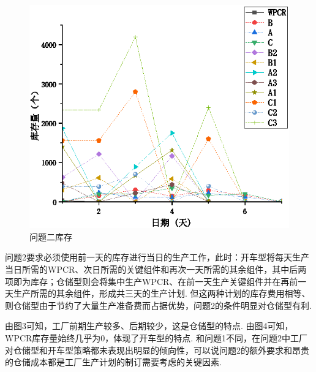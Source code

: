 \begin{figure}[!htbp]
	\centering
	\includegraphics{Image/问题二库存.eps}
	\caption{问题二库存}\label{问题二库存}
\end{figure}

问题2要求必须使用前一天的库存进行当日的生产工作，此时：开车型将每天生产当日所需的WPCR、次日所需的关键组件和再次一天所需的其余组件，其中后两项即为库存；仓储型则会将集中生产WPCR、在前一天生产关键组件并在再前一天生产所需的其余组件，形成共三天的生产计划.
但这两种计划的库存费用相等、则仓储型由于节约了大量生产准备费而占据优势，问题2的条件明显对仓储型有利.

由图3可知，工厂前期生产较多、后期较少，这是仓储型的特点.
由图4可知，WPCR库存量始终几乎为0，体现了开车型的特点.
和问题1不同，在问题2中工厂对仓储型和开车型策略都未表现出明显的倾向性，可以说问题2的额外要求和昂贵的仓储成本都是工厂生产计划的制订需要考虑的关键因素.

